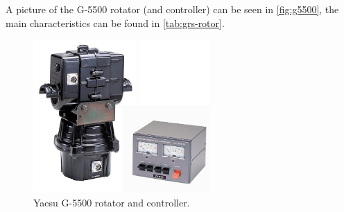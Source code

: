 A picture of the G-5500 rotator (and controller) can be seen in \autoref{fig:g5500}, the main characteristics can be found in \autoref{tab:grs-rotor}.

\begin{figure}[!ht]
    \begin{center}
        \includegraphics[width=0.6\textwidth]{figures/g5500.jpg}
        \caption{Yaesu G-5500 rotator and controller.}
        \label{fig:g5500}
    \end{center}
\end{figure}

